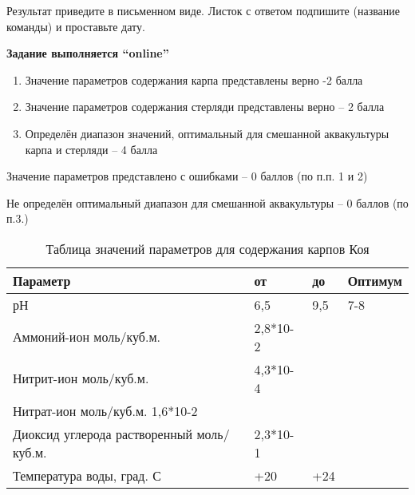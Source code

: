 
Результат приведите в письменном виде. Листок с ответом подпишите (название команды) и проставьте дату.

\textbf{Задание выполняется “online”}

\markSection

\begin{enumerate}
    \item Значение параметров содержания карпа представлены верно -2 балла
    \item Значение параметров содержания стерляди представлены верно – 2 балла
    \item Определён диапазон значений, оптимальный для смешанной аквакультуры карпа и стерляди – 4 балла
\end{enumerate}

Значение параметров представлено с ошибками – 0 баллов (по п.п. 1 и 2)

Не определён оптимальный диапазон для смешанной аквакультуры – 0 баллов (по п.3.)

\solutionSection

\begin{table}[H]
    \caption{Таблица значений параметров для содержания карпов Коя}
    \begin{tabular}{|l|l|l|l|}
        \hline
        Параметр &от&	до&	Оптимум \\
        \hline
        рН&	6,5	&9,5&	7-8&\\
        \hline
        Аммоний-ион моль/куб.м.	&	2,8*10-2	& \\
        \hline
        Нитрит-ион моль/куб.м.	&	4,3*10-4&	\\
        \hline
        Нитрат-ион моль/куб.м.		1,6*10-2	& \\
        \hline
        Диоксид углерода 
        растворенный моль/куб.м.	&	2,3*10-1	& \\
        \hline
        Температура воды, град. С	&+20&	+24	& \\
    \end{tabular}
\end{table}

